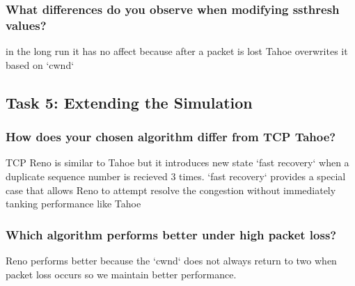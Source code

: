 \documentclass{article}
\begin{document}
\subsubsection{What differences do you observe when modifying ssthresh values?}
in the long run it has no affect because after a packet is lost Tahoe overwrites it based on `cwnd`


\subsection{Task 5: Extending the Simulation}

\subsubsection{How does your chosen algorithm differ from TCP Tahoe?}
TCP Reno is similar to Tahoe but it introduces new state `fast recovery` when a duplicate sequence number is recieved 3 times.
`fast recovery` provides a special case that allows Reno to attempt resolve the congestion without immediately tanking performance like Tahoe

\subsubsection{Which algorithm performs better under high packet loss?}
Reno performs better because the `cwnd` does not always return to two when packet loss occurs so we maintain better performance. 
\end{document}
